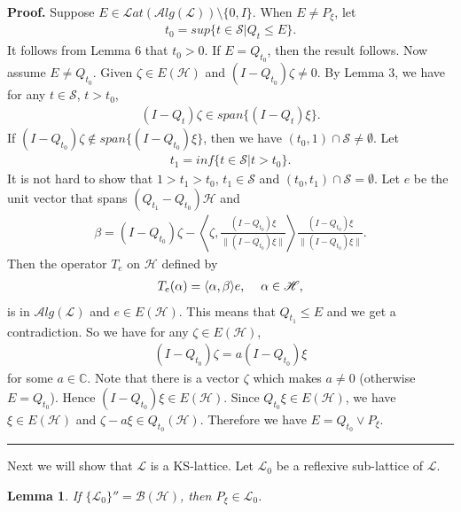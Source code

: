 \documentclass[12pt]{article}
\newtheorem{lemma}[theorem]{Lemma}
\newenvironment{proof}[1][Proof]{\textbf{#1.} }{\ \rule{0.5em}{0.5em}}
\def\Lat{{\mathcal Lat}}\def\Alg{{\mathcal Alg}}
\newcommand{\BBB}{\mathcal B}
\newcommand{\HHH}{\mathscr H} %
\newcommand{\LLL}{\mathscr L} %
\newcommand{\SSS}{\mathcal S}
\newcommand{\PP}[1]{ P_{#1}} %
\newcommand{\QQ}[1]{ Q_{#1}}
\def\Lat{\mathcal Lat}
\def\Alg{\mathcal Alg}
\def\C{\mathbb C} %
\begin{document}
\noindent\begin{proof} Suppose $E \in \Lat(\Alg(\LLL)) \setminus
\{0, I \}$. When $E \neq \PP {\xi}$, let
\begin{align*}
t_0 = sup \{ t \in \SSS | \QQ {t} \leq E \}.
\end{align*}
It follows from Lemma 6 that $t_0
> 0$. If $E = \QQ {t_0}$, then the result follows. Now assume $E \neq \QQ
{t_0}$. Given $ \zeta \in E(\HHH)$ and $(I - \QQ {t_0})\zeta \neq
0$. By Lemma 3, we have for any $t\in \SSS$, $ t > t_0$,
\begin{align*}
(I - \QQ {t})\zeta \in span \{ (I - \QQ {t})\xi \}.
\end{align*}
If $(I - \QQ {t_0})\zeta \notin span \{ (I - \QQ {t_0})\xi \}$, then
we have $(t_0, 1) \cap \SSS \neq \emptyset$. Let
\begin{align*}
t_1 = inf \{ t \in \SSS | t > t_0\}.
\end{align*}
It is not hard to show that $1 > t_1 > t_0$, $t_1 \in \SSS$ and
$(t_0, t_1) \cap \SSS = \emptyset$. Let $e$ be the unit vector that
spans $(\QQ {t_1} - \QQ {t_0})\HHH$ and
\begin{align*}
\beta = (I - \QQ {t_0}) \zeta - \left\langle\zeta, \frac{(I - \QQ
{t_0})\xi}{\|(I - \QQ {t_0}) \xi \|} \right\rangle \frac{(I - \QQ
{t_0})\xi}{\|(I - \QQ {t_0}) \xi \|}.
\end{align*}
Then the operator $T_e$ on $\HHH$ defined by
\begin{align*}
T_{e} ( \alpha)=\langle \alpha, \beta \rangle e,\hskip12pt \alpha
\in \HHH,
\end{align*}
is in $\Alg(\LLL)$ and $e \in E(\HHH)$. This means that $\QQ {t_1}
\leq E$ and we get a contradiction. So we have for any $ \zeta \in E
(\HHH)$,
\begin{align*}
(I - \QQ {t_0})\zeta = a(I - \QQ {t_0}) \xi
\end{align*}
for some $a \in \C$. Note that there is a vector $\zeta$ which makes
$a \neq 0$ (otherwise $E = \QQ {t_0}$). Hence $(I - \QQ {t_0}) \xi
\in E(\HHH)$. Since $\QQ {t_0} \xi \in E (\HHH)$, we have $\xi \in E
(\HHH)$ and $\zeta - a\xi \in \QQ {t_0} (\HHH)$. Therefore we have
$E = \QQ {t_0} \vee \PP {\xi}$.
\end{proof}\newline

Next we will show that $\LLL$ is a KS-lattice. Let $\LLL_{0}$ be a
reflexive sub-lattice of $\LLL$.

\begin{lemma}
If $\{ \LLL_{0} \}'' = \BBB(\HHH)$, then $\PP {\xi} \in \LLL_{0}$.
\end{lemma}
\end{document}

